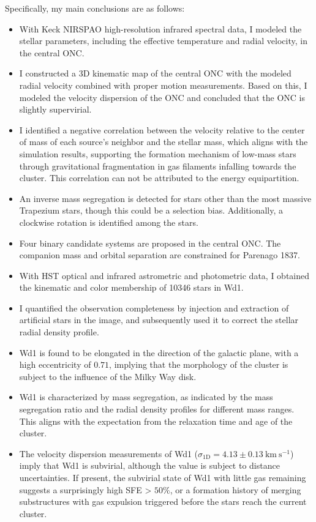 \documentclass[12pt]{ucsddissertation}
\begin{document}
\begin{CJK*}{UTF8}{gbsn}
Specifically, my main conclusions are as follows:
\begin{itemize}
    \item With Keck NIRSPAO high-resolution infrared spectral data, I modeled the stellar parameters, including the effective temperature and radial velocity, in the central ONC.
    \item I constructed a 3D kinematic map of the central ONC with the modeled radial velocity combined with proper motion measurements. Based on this, I modeled the velocity dispersion of the ONC and concluded that the ONC is slightly supervirial.
    \item I identified a negative correlation between the velocity relative to the center of mass of each source's neighbor and the stellar mass, which aligns with the simulation results, supporting the formation mechanism of low-mass stars through gravitational fragmentation in gas filaments infalling towards the cluster. This correlation can not be attributed to the energy equipartition.
    \item An inverse mass segregation is detected for stars other than the most massive Trapezium stars, though this could be a selection bias. Additionally, a clockwise rotation is identified among the stars.
    \item Four binary candidate systems are proposed in the central ONC. The companion mass and orbital separation are constrained for Parenago 1837.
    \item With HST optical and infrared astrometric and photometric data, I obtained the kinematic and color membership of \num{10346} stars in Wd1.
    \item I quantified the observation completeness by injection and extraction of artificial stars in the image, and subsequently used it to correct the stellar radial density profile.
    \item Wd1 is found to be elongated in the direction of the galactic plane, with a high eccentricity of $0.71$, implying that the morphology of the cluster is subject to the influence of the Milky Way disk.
    \item Wd1 is characterized by mass segregation, as indicated by the mass segregation ratio and the radial density profiles for different mass ranges. This aligns with the expectation from the relaxation time and age of the cluster.
    \item The velocity dispersion measurements of Wd1 ($\sigma_\mathrm{1D} = 4.13 \pm 0.13~\mathrm{km}~\mathrm{s}^{-1}$) imply that Wd1 is subvirial, although the value is subject to distance uncertainties. If present, the subvirial state of Wd1 with little gas remaining suggests a surprisingly high SFE > $50\%$, or a formation history of merging substructures with gas expulsion triggered before the stars reach the current cluster.

\end{itemize}
\end{CJK*}
\end{document}

